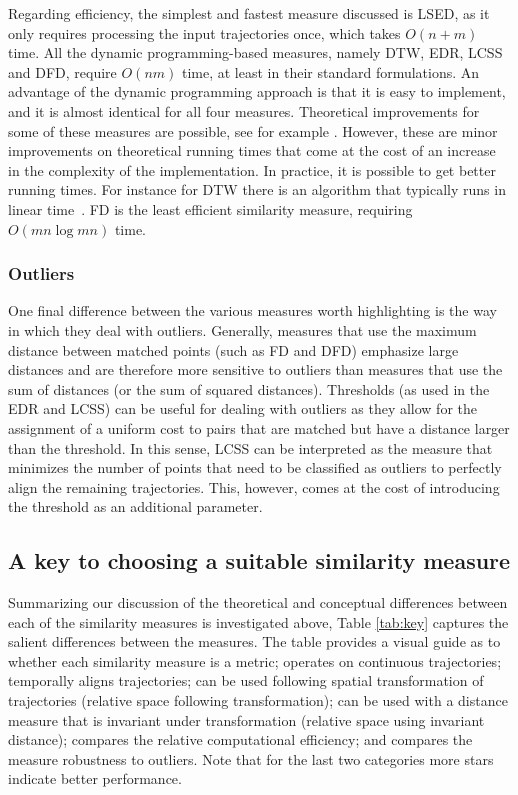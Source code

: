 \documentclass[10pt,letterpaper]{article}
\begin{document}
Regarding efficiency, the simplest and fastest measure discussed is LSED, as it only requires processing the input trajectories once, which takes $O(n+m)$ time.
All the dynamic programming-based measures, namely DTW, EDR, LCSS and DFD, require $O(nm)$ time, at least in their standard formulations.
An advantage of the dynamic programming approach is that it is easy to implement, and it is almost identical for all four measures.
Theoretical improvements for some of these measures are possible, see for example \cite{DBLP:conf/icde/2002,bbmm-fswd-14,Masek198018}.
However, these are minor improvements on theoretical running times that come at the cost of an increase in the complexity of the implementation.
In practice, it is possible to get better running times. For instance for DTW there is an algorithm that typically runs in linear time~\cite{keogh2005exact}. FD is the least efficient similarity measure, requiring $O(mn\log mn)$ time. 

\subsubsection{Outliers}

One final difference between the various measures worth highlighting is the way in which they deal with outliers. Generally, measures that use the maximum distance between matched points (such as FD and DFD) emphasize large distances and are therefore more sensitive to outliers than measures that use the sum of distances (or the sum of squared distances). Thresholds (as used in the EDR and LCSS) can be useful for dealing with outliers as they allow for the assignment of a uniform cost to pairs that are matched but have a distance larger than the threshold. In this sense, LCSS can be interpreted as the measure that minimizes the number of points that need to be classified as outliers to perfectly align the remaining trajectories. This, however, comes at the cost of introducing the threshold as an additional parameter.

\subsection{A key to choosing a suitable similarity measure}

Summarizing our discussion of the  theoretical and conceptual differences between each of the similarity measures is investigated above, Table \ref{tab:key}  captures the salient differences between the measures.  The table provides a visual guide as to whether each similarity measure is a metric; operates on continuous trajectories; temporally aligns trajectories; can be used following spatial transformation of trajectories (relative space following transformation); can be used with a distance measure that is invariant under transformation (relative space using invariant distance);  compares the relative computational efficiency;  and compares the measure robustness to outliers. Note that for the last two categories more stars indicate better performance. 
\end{document}
